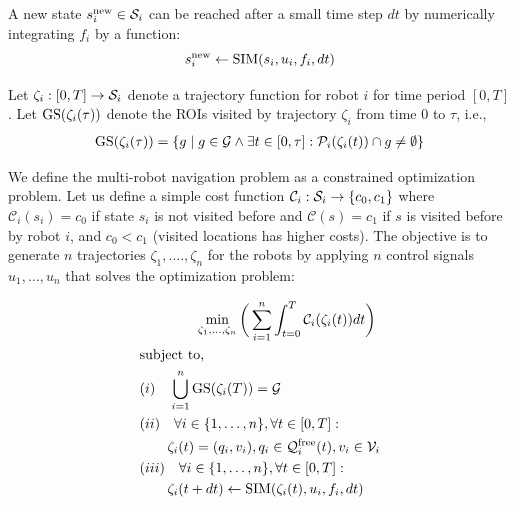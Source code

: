 \documentclass[letterpaper, 10 pt, conference]{ieeeconf}  %
\begin{document}
A new state $s_i^{\operatorname{new}} \in \mathcal{S}_i$ can be reached after a small time step $dt$ by numerically integrating $f_i$ by a function:
\begin{equation}
    s_i^{\operatorname{new}} \gets \operatorname{SIM}(s_i, u_i, f_i, dt)
\end{equation}

Let $\zeta_i: [0,T] \to \mathcal{S}_i$ denote a trajectory function for robot $i$ for time period $[0,T]$. Let $\operatorname{GS}(\zeta_i(\tau))$ denote the ROIs visited by trajectory $\zeta_i$ from time $0$ to $\tau$, i.e.,
\begin{equation}
\begin{split}
\operatorname{GS}(\zeta_i(\tau)) = \{ g \mid g \in \mathcal{G} \land \exists t \in [0,\tau]: \mathcal{P}_i(\zeta_i(t)) \cap g \neq \emptyset \}
\end{split}
\end{equation}

We define the multi-robot navigation problem as a constrained optimization problem. Let us define a simple cost function $\mathcal{C}_i: \mathcal{S}_i \to \{ c_0, c_1 \}$ where $\mathcal{C}_i(s_i) = c_0$ if state $s_i$ is not visited before and $\mathcal{C}(s) = c_1$ if $s$ is visited before by robot $i$, and $c_0 < c_1$ (visited locations has higher costs). The objective is to generate $n$ trajectories $\zeta_1,\ldots.,\zeta_n$ for the robots by applying $n$ control signals $u_1,\ldots,u_n$ that solves the optimization problem:

\begin{align}
& \qquad \qquad \min_{\zeta_1, \ldots, \zeta_n} \bigg( \sum_{i=1}^{n} \int_{t=0}^{T} \mathcal{C}_i (\zeta_i(t))dt \bigg)   \label{eq:opt} \\
& \textrm{subject to, }    \nonumber \\
& (i) \quad \bigcup_{i=1}^n \operatorname{GS}(\zeta_i(T)) = \mathcal{G}  \label{eq:const1}\\
& (ii) \quad \forall i \in \{1,\ldots,n\}, \forall t \in [0,T]: \nonumber \\
& \qquad \zeta_i(t) = (q_i, v_i), q_i \in \mathcal{Q}_i^{\mathrm{free}}(t), v_i \in \mathcal{V}_i \label{eq:const2}\\
& (iii) \quad \forall i \in \{1,\ldots,n\}, \forall t \in [0,T]: \nonumber \\
& \qquad \zeta_i(t+dt) \gets \operatorname{SIM}( \zeta_i(t), u_i, f_i, dt) \label{eq:const3}
\end{align}
\end{document}
